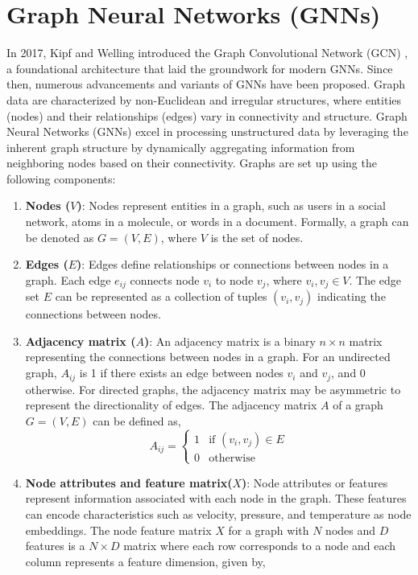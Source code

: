 \section{Graph Neural Networks (GNNs)} \label{gnnse}
In 2017, Kipf and Welling introduced the Graph Convolutional Network (GCN) \cite{kipf}, a foundational architecture that laid the groundwork for modern GNNs. Since then, numerous advancements and variants of GNNs have been proposed. Graph data are characterized by non-Euclidean and irregular structures, where entities (nodes) and their relationships (edges) vary in connectivity and structure. Graph Neural Networks (GNNs) excel in processing unstructured data by leveraging the inherent graph structure by dynamically aggregating information from neighboring nodes based on their connectivity. Graphs are set up using the following components:
\begin{enumerate}
  \item \textbf{Nodes (\(V\))}: Nodes represent entities in a graph, such as users in a social network, atoms in a molecule, or words in a document. Formally, a graph can be denoted as \( G = (V, E) \), where \( V \) is the set of nodes.
  \item \textbf{Edges (\(E\))}: Edges define relationships or connections between nodes in a graph. Each edge \( e_{ij} \) connects node \( v_i \) to node \( v_j \), where \( v_i, v_j \in V \). The edge set \( E \) can be represented as a collection of tuples \( (v_i, v_j) \) indicating the connections between nodes.
  \item \textbf{Adjacency matrix (\(A\))}: An adjacency matrix is a binary $n \times n$ matrix representing the connections between nodes in a graph. For an undirected graph, \( A_{ij} \) is 1 if there exists an edge between nodes \( v_i \) and \( v_j \), and 0 otherwise. For directed graphs, the adjacency matrix may be asymmetric to represent the directionality of edges. The adjacency matrix \( A \) of a graph \( G = (V, E) \) can be defined as,
  \[
  A_{ij} = \begin{cases} 1 & \text{if } (v_i, v_j) \in E \\ 0 & \text{otherwise} \end{cases}
  \]
  \item \textbf{Node attributes and feature matrix(\(X\))}: Node attributes or features represent information associated with each node in the graph. These features can encode characteristics such as velocity, pressure, and temperature as node embeddings. The node feature matrix $X$ for a graph with \( N \) nodes and \( D \) features is a $N \times D$ matrix where each row corresponds to a node and each column represents a feature dimension, given by,

\end{enumerate}
